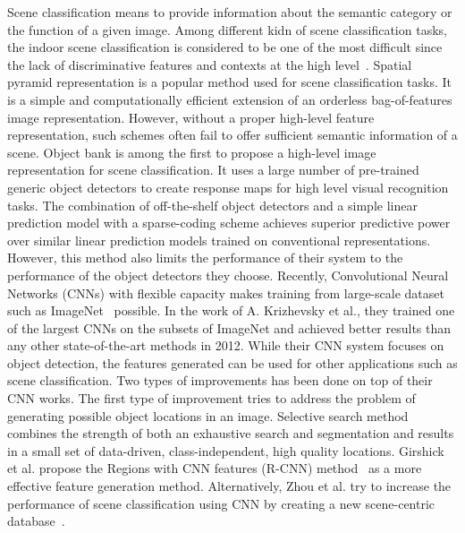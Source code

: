 
Scene classification means to provide information about the semantic category
or the function of a given image. Among different kidn of scene classification
tasks, the indoor scene classification is considered to be one of the most
difficult since the lack of discriminative features and contexts at the high
level~\cite{Quattoni:2009:RIS}. Spatial pyramid
representation\cite{Lazebnik:2006:BBF} is a popular method used for scene
classification tasks. It is a simple and computationally efficient extension of
an orderless bag-of-features image representation. However, without a proper
high-level feature representation, such schemes often fail to offer sufficient
semantic information of a scene. Object bank\cite{Li:2010:OBA} is among the
first to propose a high-level image representation for scene classification. It
uses a large number of pre-trained generic object detectors to create response
maps for high level visual recognition tasks. The combination of off-the-shelf
object detectors and a simple linear prediction model with a sparse-coding
scheme achieves superior predictive power over similar linear prediction models
trained on conventional representations. However, this method also limits the
performance of their system to the performance of the object detectors they
choose. Recently, Convolutional Neural Networks (CNNs) with flexible capacity
makes training from large-scale dataset such as ImageNet~\cite{Deng:2009:IAL}
possible. In the work of A. Krizhevsky et al.\cite{Krizhevsky:2012:ICD}, they
trained one of the largest CNNs on the subsets of ImageNet and achieved better
results than any other state-of-the-art methods in 2012. While their CNN system
focuses on object detection, the features generated can be used for other
applications such as scene classification. Two types of improvements has been
done on top of their CNN works. The first type of improvement tries to address
the problem of generating possible object locations in an image. Selective
search method~\cite{Uijlings:2013:SSO} combines the strength of both an
exhaustive search and segmentation and results in a small set of data-driven,
class-independent, high quality locations. Girshick et al. propose the Regions
with CNN features (R-CNN) method~\cite{Girshick:2013:RFH} as a more effective
feature generation method. Alternatively, Zhou et al. try to increase the
performance of scene classification using CNN by creating a new scene-centric
database~\cite{Zhou:2014:LDF}.

